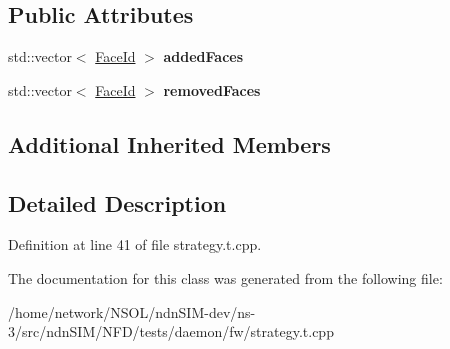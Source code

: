 \subsection*{Public Attributes}
\begin{DoxyCompactItemize}
\item 
std\+::vector$<$ \hyperlink{classFaceId}{Face\+Id} $>$ {\bfseries added\+Faces}\hypertarget{classnfd_1_1fw_1_1tests_1_1FaceTableAccessTestStrategy_ad3e9eb82a9e05ebb4f399be193b2b408}{}\label{classnfd_1_1fw_1_1tests_1_1FaceTableAccessTestStrategy_ad3e9eb82a9e05ebb4f399be193b2b408}

\item 
std\+::vector$<$ \hyperlink{classFaceId}{Face\+Id} $>$ {\bfseries removed\+Faces}\hypertarget{classnfd_1_1fw_1_1tests_1_1FaceTableAccessTestStrategy_ab3db3ab84729699315faf6650507a9be}{}\label{classnfd_1_1fw_1_1tests_1_1FaceTableAccessTestStrategy_ab3db3ab84729699315faf6650507a9be}

\end{DoxyCompactItemize}
\subsection*{Additional Inherited Members}


\subsection{Detailed Description}


Definition at line 41 of file strategy.\+t.\+cpp.



The documentation for this class was generated from the following file\+:\begin{DoxyCompactItemize}
\item 
/home/network/\+N\+S\+O\+L/ndn\+S\+I\+M-\/dev/ns-\/3/src/ndn\+S\+I\+M/\+N\+F\+D/tests/daemon/fw/strategy.\+t.\+cpp\end{DoxyCompactItemize}
